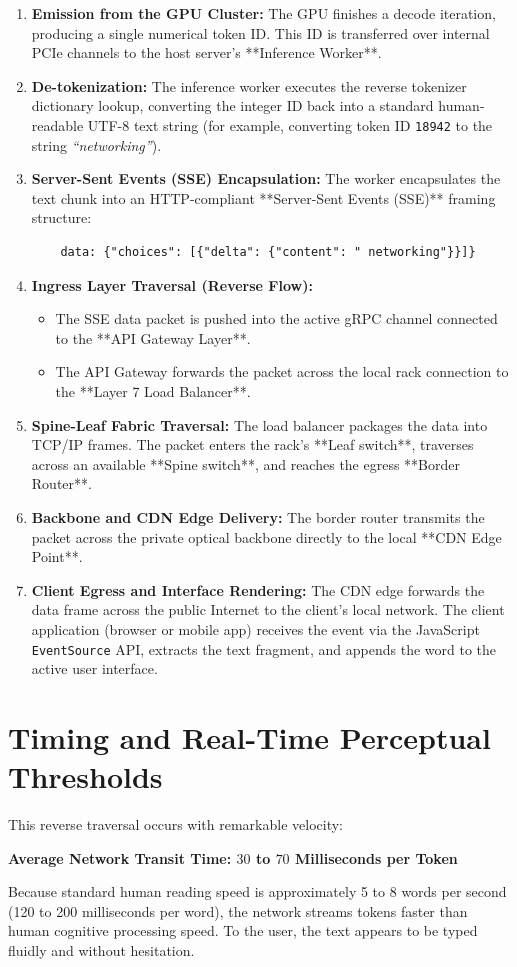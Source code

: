 \documentclass[12pt,a4paper]{report}
\begin{document}
\begin{enumerate}[leftmargin=1.2cm]
    \item \textbf{Emission from the GPU Cluster:} The GPU finishes a decode iteration, producing a single numerical token ID. This ID is transferred over internal PCIe channels to the host server's **Inference Worker**.
    \item \textbf{De-tokenization:} The inference worker executes the reverse tokenizer dictionary lookup, converting the integer ID back into a standard human-readable UTF-8 text string (for example, converting token ID \texttt{18942} to the string \textit{``networking''}).
    \item \textbf{Server-Sent Events (SSE) Encapsulation:} The worker encapsulates the text chunk into an HTTP-compliant **Server-Sent Events (SSE)** framing structure:
    \begin{verbatim}
    data: {"choices": [{"delta": {"content": " networking"}}]}
    \end{verbatim}
    \item \textbf{Ingress Layer Traversal (Reverse Flow):}
    \begin{itemize}
        \item The SSE data packet is pushed into the active gRPC channel connected to the **API Gateway Layer**.
        \item The API Gateway forwards the packet across the local rack connection to the **Layer 7 Load Balancer**.
    \end{itemize}
    \item \textbf{Spine-Leaf Fabric Traversal:} The load balancer packages the data into TCP/IP frames. The packet enters the rack's **Leaf switch**, traverses across an available **Spine switch**, and reaches the egress **Border Router**.
    \item \textbf{Backbone and CDN Edge Delivery:} The border router transmits the packet across the private optical backbone directly to the local **CDN Edge Point**.
    \item \textbf{Client Egress and Interface Rendering:} The CDN edge forwards the data frame across the public Internet to the client's local network. The client application (browser or mobile app) receives the event via the JavaScript \texttt{EventSource} API, extracts the text fragment, and appends the word to the active user interface.
\end{enumerate}

\section{Timing and Real-Time Perceptual Thresholds}
This reverse traversal occurs with remarkable velocity:
\begin{center}
    \textbf{Average Network Transit Time: $30$ to $70$ Milliseconds per Token}
\end{center}
Because standard human reading speed is approximately 5 to 8 words per second (120 to 200 milliseconds per word), the network streams tokens faster than human cognitive processing speed. To the user, the text appears to be typed fluidly and without hesitation.
\end{document}
